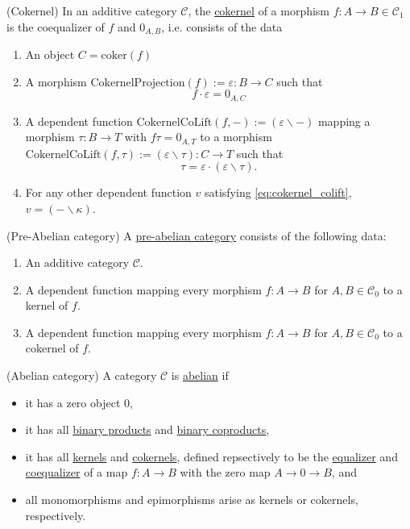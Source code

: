 \begin{definition}{(Cokernel)}
In an additive category $\mathcal{C}$, the \ul{cokernel} of a morphism $f : A \rightarrow B \in \mathcal{C}_{1}$ is the coequalizer of
$f$ and $0_{A,B}$, i.e. consists of the data
\begin{enumerate}
\renewcommand{\labelenumi}{(\theenumi)}
\item An object $C = \mathrm{coker}(f)$
\item A morphism $\mathrm{CokernelProjection}(f) := \varepsilon : B \rightarrow C$ such that
\[
f \cdot \varepsilon = 0_{A,C}
\]
\item A dependent function $\mathrm{CokernelCoLift}(f,-) := ( \varepsilon \backslash -)$ mapping a morphism $\tau : B \rightarrow T$ with
$f \tau  = 0_{A,T}$ to a morphism $\mathrm{CokernelCoLift}(f,\tau) := ( \varepsilon \backslash \tau) : C \rightarrow T$ such that
\[
\tau =\label{eq:cokernel_colift} \varepsilon \cdot (\varepsilon \backslash \tau).
\]
\item For any other dependent function $v$ satisfying \eqref{eq:cokernel_colift}, $v = ( - \backslash \kappa)$.
\end{enumerate}
\end{definition}

\begin{definition}{(Pre-Abelian category)}
A \ul{pre-abelian category} consists of the following data:
\begin{enumerate}
\item An additive category $\mathcal{C}$.
\item A dependent function mapping every morphism $f : A \rightarrow B$ for $A, B \in \mathcal{C}_{0}$ to a
kernel of $f$.
\item A dependent function mapping every morphism $f : A \rightarrow B$ for $A, B \in \mathcal{C}_{0}$ to a
cokernel of $f$.
\end{enumerate}
\end{definition}


\begin{definition}{(Abelian category)}
A category $\mathcal{C}$ is \ul{abelian} if
\begin{itemize}
\item it has a zero object $0$,
\item it has all \ul{binary products} and \ul{binary coproducts},
\item it has all \ul{kernels} and \ul{cokernels}, defined repsectively to be the \ul{equalizer} and
\ul{coequalizer} of a map $f : A \rightarrow B$ with the zero map $A \rightarrow 0 \rightarrow B$, and
\item all monomorphisms and epimorphisms arise as kernels or cokernels, respectively.
\end{itemize}
\end{definition}

